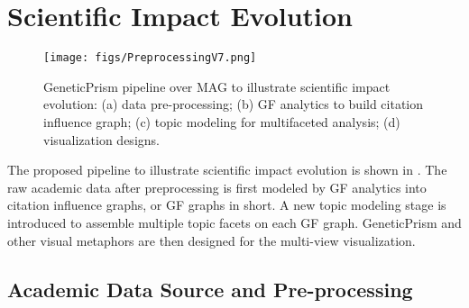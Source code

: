 \section{Scientific Impact Evolution}

\begin{figure*}[tb]
  \centering
  \texttt{[image: figs/PreprocessingV7.png]}
  \caption{GeneticPrism pipeline over MAG to illustrate scientific impact evolution: (a) data pre-processing; (b) GF analytics to build citation influence graph; (c) topic modeling for multifaceted analysis; (d) visualization designs.
  }
  \label{fig:Pipeline}
\end{figure*}

The proposed pipeline to illustrate scientific impact evolution is shown in . The raw academic data after preprocessing is first modeled by GF analytics into citation influence graphs, or GF graphs in short. A new topic modeling stage is introduced to assemble multiple topic facets on each GF graph. GeneticPrism and other visual metaphors are then designed for the multi-view visualization.

\subsection{Academic Data Source and Pre-processing}

